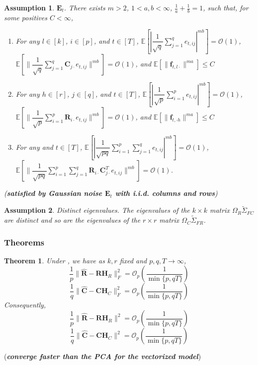 \documentclass{article}[12pt]
\newtheorem{assumption}{Assumption}
\newtheorem{theorem}{Theorem}
\begin{document}
\begin{assumption}\label{assumption 5 1.7.1}
     $\mathbf{E}_t$. \normalfont There exists $m>2$, $1<a,b<\infty$, $\frac{1}{a}+\frac{1}{b} = 1$, such that, for some positives $C<\infty$,
    \begin{enumerate}
        \item For any $l \in \left[k\right]$, $i \in \left[p\right]$, and $t \in \left[T\right]$, $\mathbb{E}\left[|\dfrac{1}{\sqrt{q}}\sum_{j=1}^{q}e_{t,ij}|^{mb}\right] = \mathcal{O}(1)$, $\mathbb{E}\left[\lVert\dfrac{1}{\sqrt{q}}\sum_{j=1}^{q}\mathbf{C}_{j\cdot}e_{t,ij}\rVert^{mb}\right] = \mathcal{O}(1)$, and $\mathbb{E}\left[\lVert\mathbf{f}_{t,l\cdot}\rVert^{ma}\right] \leq C$
        \item For any $h \in \left[r\right]$, $j \in \left[q\right]$, and $t \in \left[T\right]$, $\mathbb{E}\left[|\dfrac{1}{\sqrt{p}}\sum_{i=1}^{p}e_{t,ij}|^{mb}\right] = \mathcal{O}(1)$, $\mathbb{E}\left[\lVert\dfrac{1}{\sqrt{p}}\sum_{i=1}^{p}\mathbf{R}_{i\cdot}e_{t,ij}\rVert^{mb}\right] = \mathcal{O}(1)$, and $\mathbb{E}\left[\lVert\mathbf{f}_{t,\cdot h}\rVert^{ma}\right] \leq C$
        \item For any and $t \in \left[T\right]$, $\mathbb{E}\left[|\dfrac{1}{\sqrt{pq}}\sum_{i=1}^{p}\sum_{j=1}^qe_{t,ij}|^{mb}\right] = \mathcal{O}(1)$, $\mathbb{E}\left[\lVert\dfrac{1}{\sqrt{pq}}\sum_{i=1}^{p}\sum_{j=1}^q\mathbf{R}_{i\cdot}\mathbf{C}_{j\cdot}^Te_{t,ij}\rVert^{mb}\right] = \mathcal{O}(1)$.    
    \end{enumerate}
    
\noindent (\textbf{\textit{satisfied by Gaussian noise $\mathbf{E}_t$ with i.i.d. columns and rows}})
\end{assumption}

\begin{assumption}\label{assumption 6 1.7.1}
    Distinct eigenvalues. \normalfont The eigenvalues of the $k \times k$ matrix $\Omega_R\widetilde{\Sigma}_{FC}$ are distinct and so are the eigenvalues of the $r \times r$ matrix $\Omega_C\widetilde{\Sigma}_{FR}$.
\end{assumption}

\subsubsection{Theorems}

\begin{theorem}
    \normalfont Under  , we have as $k,r$ fixed and $p,q,T \rightarrow \infty$,
    $$\dfrac{1}{p}\lVert\mathbf{\widehat{R}} - \mathbf{R}\mathbf{H}_R\rVert_F^2 = \mathcal{O}_p\left(\dfrac{1}{\min\{p,qT\}}\right)$$
    $$\dfrac{1}{q}\lVert\mathbf{\widehat{C}} - \mathbf{C}\mathbf{H}_C\rVert_F^2 = \mathcal{O}_p\left(\dfrac{1}{\min\{p,qT\}}\right)$$
Consequently,
    $$\dfrac{1}{p}\lVert\mathbf{\widehat{R}} - \mathbf{R}\mathbf{H}_R\rVert^2 = \mathcal{O}_p\left(\dfrac{1}{\min\{p,qT\}}\right)$$
    $$\dfrac{1}{q}\lVert\mathbf{\widehat{C}} - \mathbf{C}\mathbf{H}_C\rVert^2 = \mathcal{O}_p\left(\dfrac{1}{\min\{p,qT\}}\right)$$
\end{theorem}
\noindent (\textbf{\textit{converge faster than the PCA for the vectorized model}})
\end{document}
